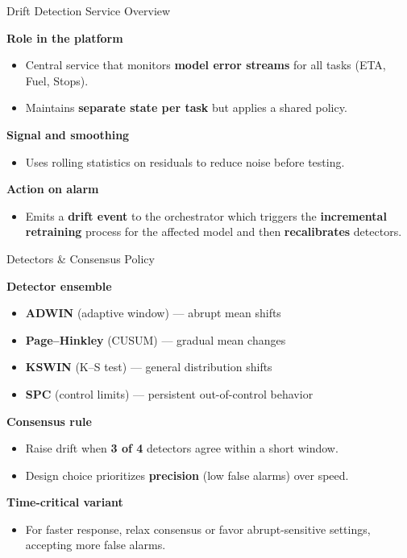 \documentclass[aspectratio=169,11pt]{beamer}
\begin{document}
\begin{frame}{Drift Detection Service Overview}

    \textbf{Role in the platform}
    \begin{itemize}
        \item Central service that monitors \textbf{model error streams} for all tasks (ETA, Fuel, Stops).
        \item Maintains \textbf{separate state per task} but applies a shared policy.
    \end{itemize}

    \vspace{0.4em}
    \textbf{Signal and smoothing}
    \begin{itemize}
        \item Uses rolling statistics on residuals to reduce noise before testing.
    \end{itemize}

    \vspace{0.4em}
    \textbf{Action on alarm}
    \begin{itemize}
        \item Emits a \textbf{drift event} to the orchestrator which triggers the \textbf{incremental retraining} process for the affected model and then \textbf{recalibrates} detectors.
    \end{itemize}

\end{frame}

\begin{frame}{Detectors \& Consensus Policy}

    \textbf{Detector ensemble}
    \begin{itemize}
        \item \textbf{ADWIN} (adaptive window) — abrupt mean shifts
        \item \textbf{Page–Hinkley} (CUSUM) — gradual mean changes
        \item \textbf{KSWIN} (K–S test) — general distribution shifts
        \item \textbf{SPC} (control limits) — persistent out-of-control behavior
    \end{itemize}

    \vspace{0.4em}
    \textbf{Consensus rule}
    \begin{itemize}
        \item Raise drift when \textbf{3 of 4} detectors agree within a short window.
        \item Design choice prioritizes \textbf{precision} (low false alarms) over speed.
    \end{itemize}

    \vspace{0.4em}
    \textbf{Time-critical variant}
    \begin{itemize}
        \item For faster response, relax consensus or favor abrupt-sensitive settings, accepting more false alarms.
    \end{itemize}

\end{frame}
\end{document}
